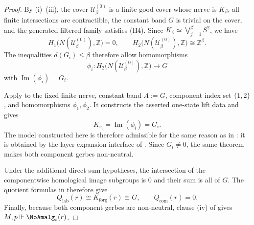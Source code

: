 \begin{proof}
By (i)--(iii), the cover
$\mathcal U_\beta^{(0)}$ is a finite good cover whose nerve is
$K_\beta$, all finite intersections are contractible, the constant band
$G$ is trivial on the cover, and the generated filtered family satisfies
\textup{(H4)}. Since $K_\beta\simeq\bigvee_{j=1}^{\beta}S^2$, we have
\[
H_1\bigl(N(\mathcal U_\beta^{(0)}),\mathbb Z\bigr)=0,
\qquad
H_2\bigl(N(\mathcal U_\beta^{(0)}),\mathbb Z\bigr)\cong \mathbb Z^\beta.
\]
The inequalities $d(G_i)\le\beta$ therefore allow homomorphisms
\[
\phi_i:H_2\bigl(N(\mathcal U_\beta^{(0)}),\mathbb Z\bigr)\to G
\]
with $\operatorname{Im}(\phi_i)=G_i$.

Apply  to the fixed finite nerve,
constant band $A:=G$, component index set $\{1,2\}$, and homomorphisms
$\phi_1,\phi_2$. It constructs the asserted one-state lift data
and gives
\[
K_{v_i}=\operatorname{Im}(\phi_i)=G_i.
\]
The model constructed here is therefore admissible for the same reason as in
: it is obtained by the layer-expansion
interface of .
Since $G_i\ne0$, the same theorem makes both component gerbes
non-neutral.

Under the additional direct-sum hypotheses, the intersection of the componentwise homological image subgroups is $0$ and their sum
is all of $G$. The quotient formulas in
therefore give
\[
Q_{\mathrm{lab}}(r)\cong K_{\mathrm{forg}}(r)\cong G,
\qquad
Q_{\mathrm{com}}(r)=0.
\]
Finally, because both component gerbes are non-neutral,
clause \textup{(iv)} of  gives
$M,p\Vdash \NoAmalg_s(r)$.
\end{proof}

